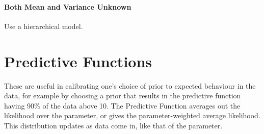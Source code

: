 \documentclass{article}
\begin{document}
\paragraph{Both Mean and Variance Unknown}
Use a hierarchical model.

\section{Predictive Functions}
These are useful in calibrating one's choice of prior to expected behaviour in the data, for example by choosing a prior that results in the predictive function having 90\% of the data above 10. The Predictive Function averages out the likelihood over the parameter, or gives the parameter-weighted average likelihood. This distribution updates as data come in, like that of the parameter.

\end{document}
